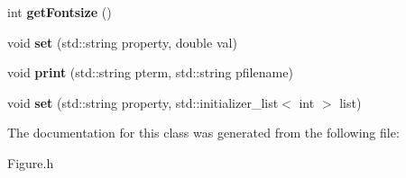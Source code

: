 \begin{DoxyCompactItemize}
\item 
\hypertarget{classkeycpp_1_1_figure_a6c1e59c4e8288e3880bde70db3723037}{int {\bfseries get\-Fontsize} ()}\label{classkeycpp_1_1_figure_a6c1e59c4e8288e3880bde70db3723037}

\item 
\hypertarget{classkeycpp_1_1_figure_a7375fe8611759fda180d626f91eab510}{void {\bfseries set} (std\-::string property, double val)}\label{classkeycpp_1_1_figure_a7375fe8611759fda180d626f91eab510}

\item 
\hypertarget{classkeycpp_1_1_figure_ac6d1881c6dc996eb508adf2126905d38}{void {\bfseries print} (std\-::string pterm, std\-::string pfilename)}\label{classkeycpp_1_1_figure_ac6d1881c6dc996eb508adf2126905d38}

\item 
\hypertarget{classkeycpp_1_1_figure_af82ed243d2b4f59f5e01566eb03cf9d3}{void {\bfseries set} (std\-::string property, std\-::initializer\-\_\-list$<$ int $>$ list)}\label{classkeycpp_1_1_figure_af82ed243d2b4f59f5e01566eb03cf9d3}

\end{DoxyCompactItemize}


The documentation for this class was generated from the following file\-:\begin{DoxyCompactItemize}
\item 
Figure.\-h\end{DoxyCompactItemize}
